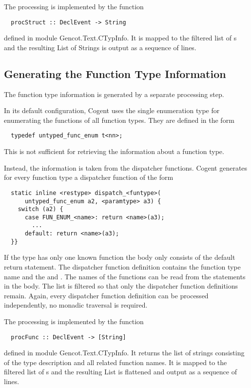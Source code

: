 The processing is implemented by the function
\begin{verbatim}
  procStruct :: DeclEvent -> String
\end{verbatim}
defined in module Gencot.Text.CTypInfo. It is mapped to the filtered list of s and the resulting
List of Strings is output as a sequence of lines.

\subsection{Generating the Function Type Information}
\label{impl-ctypinfo-func}

The function type information is generated by a separate processing step. 

In its default configuration, Cogent uses the single enumeration type  for enumerating
the functions of all function types. They are defined in the form
\begin{verbatim}
  typedef untyped_func_enum t<nn>;
\end{verbatim}
This is not sufficient for retrieving the information about a function type.

Instead, the information is taken from the dispatcher functions. Cogent generates for every function type a dispatcher 
function of the form
\begin{verbatim}
  static inline <restype> dispatch_<funtype>(
      untyped_func_enum a2, <paramtype> a3) { 
    switch (a2) {
      case FUN_ENUM_<name>: return <name>(a3);
        ...
      default: return <name>(a3);
  }}
\end{verbatim}
If the type has only one known function the body only consists of the default return statement.
The dispatcher function definition contains the function type name  and the  and .
The names of the functions can be read from the  statements in the body. The  list is filtered
so that only the dispatcher function definitions remain. Again, every dispatcher function definition
can be processed independently, no monadic traversal is required.

The processing is implemented by the function
\begin{verbatim}
  procFunc :: DeclEvent -> [String]
\end{verbatim}
defined in module Gencot.Text.CTypInfo. It returns the list of strings consisting of the type description and all related 
function names. It is mapped to the filtered list of s and the resulting
List is flattened and output as a sequence of lines.
